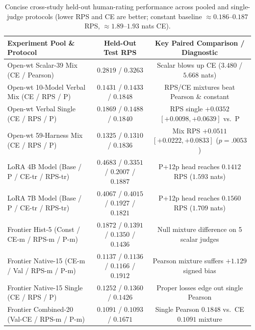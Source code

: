 \begin{table}[t]
\centering
\caption{Concise cross-study held-out human-rating performance across pooled and single-judge protocols (lower RPS and CE are better; constant baseline $\approx 0.186$--$0.187$ RPS, $\approx 1.89$--$1.93$ nats CE).}
\label{tab:human-summary-app}
\footnotesize
\setlength{\tabcolsep}{2.5pt}
\begin{tabular}{@{}lcc@{}}
\hline
Experiment Pool \& Protocol & Held-Out Test RPS & Key Paired Comparison / Diagnostic \\
\hline
Open-wt Scalar-39 Mix (CE / Pearson) & $0.2819$ / $0.3263$ & Scalar blows up CE ($3.480$ / $5.668$ nats) \\
Open-wt 10-Model Verbal Mix (CE / RPS / P) & $0.1431$ / $0.1433$ / $0.1848$ & RPS/CE mixtures beat Pearson \& constant \\
Open-wt Verbal Single (CE / RPS / P) & $0.1869$ / $0.1488$ / $0.1840$ & RPS single $+0.0352$ $[+0.0098,+0.0639]$ vs.\ P \\
Open-wt 59-Harness Mix (CE / RPS / P) & $0.1325$ / $0.1310$ / $0.1836$ & Mix RPS $+0.0511$ $[+0.0222,+0.0833]$ ($p=.0053$) \\
\hline
LoRA 4B Model (Base / P / CE-tr / RPS-tr) & $0.4683$ / $0.3351$ / $0.2007$ / $0.1887$ & P+12p head reaches $0.1412$ RPS ($1.593$ nats) \\
LoRA 7B Model (Base / P / CE-tr / RPS-tr) & $0.4067$ / $0.4015$ / $0.1927$ / $0.1821$ & P+12p head reaches $0.1560$ RPS ($1.709$ nats) \\
\hline
Frontier Hist-5 (Const / CE-m / RPS-m / P-m) & $0.1872$ / $0.1391$ / $0.1350$ / $0.1436$ & Null mixture difference on 5 scalar judges \\
Frontier Native-15 (CE-m / Val / RPS-m / P-m) & $0.1137$ / $0.1136$ / $0.1166$ / $0.1912$ & Pearson mixture suffers $+1.129$ signed bias \\
Frontier Native-15 Single (CE / RPS / P) & $0.1252$ / $0.1360$ / $0.1426$ & Proper losses edge out single Pearson \\
Frontier Combined-20 (Val-CE / RPS-m / P-m) & $0.1091$ / $0.1093$ / $0.1671$ & Single Pearson $0.1848$ vs.\ CE $0.1091$ mixture \\
\hline
\end{tabular}
\end{table}
